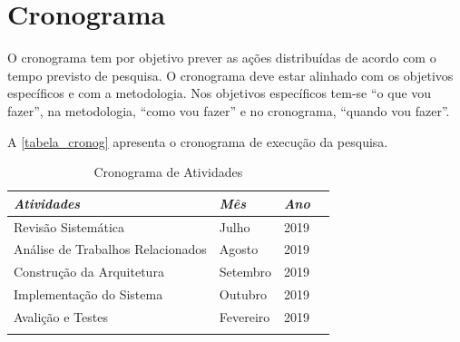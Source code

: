 \documentclass[
	12pt,				%
	openright,			%
	oneside,
	a4paper,			%
	english,			%
	french,				%
	spanish,			%
	brazil,				%
	]{abntex2}
\begin{document}


\chapter{Cronograma}

O cronograma tem por objetivo prever as ações distribuídas de acordo com o tempo previsto de pesquisa. O cronograma deve estar alinhado com os objetivos específicos e com a metodologia. Nos objetivos específicos tem-se “o que vou fazer”, na metodologia, “como vou fazer” e no cronograma, “quando vou fazer”.

A  \autoref{tabela_cronog} apresenta o cronograma de execução da pesquisa. 

\begin{table}[!htb]
\centering
\caption{Cronograma de Atividades}
\label{tabela_cronog}
\begin{tabular}{@{}llll@{}}
\toprule
\textit{Atividades}                  & \textit{Mês}       & \textit{Ano}   \\ \midrule
Revisão Sistemática                  & Julho              & 2019      \\
Análise de Trabalhos Relacionados    & Agosto             & 2019      \\
Construção da Arquitetura            & Setembro           & 2019      \\
Implementação do Sistema             & Outubro            & 2019      \\
Avalição e Testes                    & Fevereiro          & 2019      \\
                                     &                    &           \\ \bottomrule
\end{tabular}
\end{table}










\postextual
\end{document}
